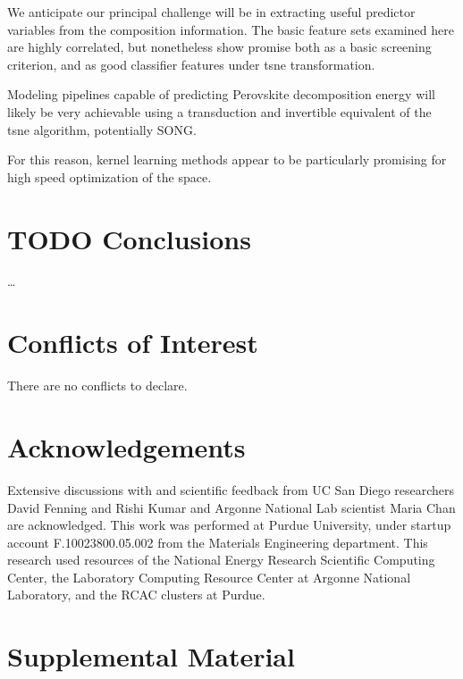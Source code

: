 \documentclass[twoside, twocolumn, 9pt, draft]{article}
\begin{document}
We anticipate our principal challenge will be in extracting useful
predictor variables from the composition information. The basic
feature sets examined here are highly correlated, but nonetheless show
promise both as a basic screening criterion, and as good classifier
features under \gls{tsne} transformation.

Modeling pipelines capable of predicting Perovskite decomposition
energy will likely be very achievable using a transduction and
invertible equivalent of the \gls{tsne} algorithm,
potentially SONG.

For this reason, kernel learning methods appear to be particularly
promising for high speed optimization of the space.

\section*{{\bfseries\sffamily TODO} Conclusions}
\label{sec:orgb74b977}
\ldots{}\\

\section*{Conflicts of Interest}
\label{sec:orge53251a}
There are no conflicts to declare.

\section*{Acknowledgements}
\label{sec:org58a51d9}
Extensive discussions with and scientific feedback from UC San Diego
researchers David Fenning and Rishi Kumar and Argonne National Lab
scientist Maria Chan are acknowledged. This work was performed at
Purdue University, under startup account F.10023800.05.002 from the
Materials Engineering department. This research used resources of the
National Energy Research Scientific Computing Center, the Laboratory
Computing Resource Center at Argonne National Laboratory, and the RCAC
clusters at Purdue.




\section*{Supplemental Material}
\label{sec:org67b5341}
\printglossaries
\end{document}
